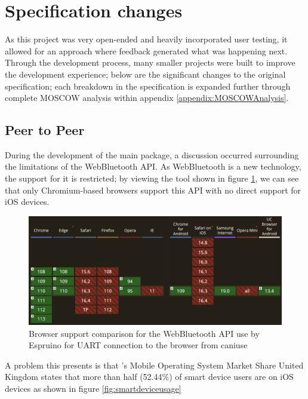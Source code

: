 \documentclass{l4proj}
\begin{document}
\section{Specification changes}

\text As this project was very open-ended and heavily incorporated user testing, it allowed for an approach where feedback generated what was happening next. Through the development process, many smaller projects were built to improve the development experience; below are the significant changes to the original specification; each breakdown in the specification is expanded further through complete MOSCOW analysis within appendix \ref{appendix:MOSCOWAnalysis}.

\subsection{Peer to Peer}
\text During the development of the main package, a discussion occurred surrounding the limitations of the WebBluetooth API. As WebBluetooth is a new technology, the support for it is restricted; by viewing the \cite{caniuse} tool shown in figure \ref{fig:caniuse_webblue}, we can see that only Chromium-based browsers support this API with no direct support for iOS devices.

\begin{figure}[!ht]
    \centering
    \includegraphics[width=12cm]{dissertation/images/caniuse_webbluetooth.png}
    \caption{Browser support comparison for the WebBluetooth API use by Espruino for UART connection to the browser from caniuse}
    \label{fig:caniuse_webblue}
\end{figure}

A problem this presents is that \cite{mobile-os-market-share}'s Mobile Operating System Market Share United Kingdom states that more than half (52.44\%) of smart device users are on iOS devices as shown in figure \ref{fig:smartdeviceusage}\\\\
\end{document}
